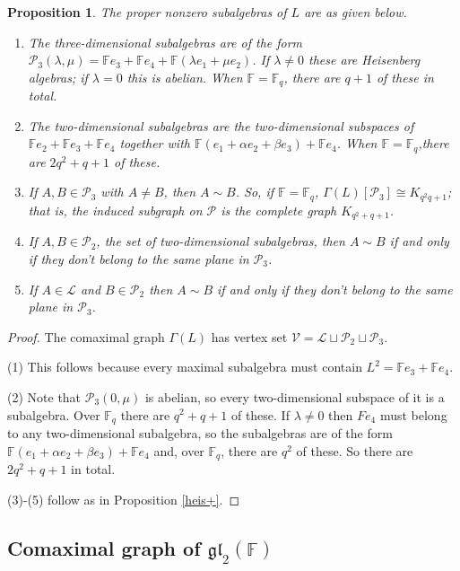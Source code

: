\documentclass[11pt]{amsart}
\theoremstyle{plain}
\newtheorem{proposition}[theorem]{Proposition}
\def\F{\mathbb{F}}
\begin{document}
\begin{proposition}\label{fil} 
The proper nonzero subalgebras of $L$ are as given below.
 \begin{enumerate}
\item The three-dimensional subalgebras are of the form $\mathcal{P}_3(\lambda,\mu)=\F e_3+\F e_4 +\F(\lambda e_1+\mu e_2)$. If $\lambda \neq 0$ these are Heisenberg algebras; if $\lambda = 0$ this is abelian. When $\F=\F_q$, there are $q+1$ of these in total.
\item The two-dimensional subalgebras are the two-dimensional subspaces of $\F e_2+\F e_3+\F e_4$ together with $\F (e_1+\alpha e_2+\beta e_3)+\F e_4$. When $\F=\F_q$,there are $2q^2+q+1$ of these.
\item  If $A, B \in \mathcal{P}_3$ with $A \neq B$, then $A \sim B$. So, if $\F=\F_q$, $\Gamma(L)[\mathcal{P}_3]\cong K_{q^2q+1}$; that is, the induced subgraph on $\mathcal{P}$ is the complete graph $K_{q^2+q+1}$.
 \item If $A,B\in \mathcal{P}_2$, the set of two-dimensional subalgebras, then $A\sim B$ if and only if they don't belong to the same plane in $\mathcal{P}_3$.

\item If $A\in \mathcal{L}$ and $B\in \mathcal{P}_2$ then $A\sim B$ if and only if they don't belong to the same plane in $\mathcal{P}_3$.
 \end{enumerate}   
\end{proposition}
\begin{proof}
The comaximal graph $\Gamma(L)$ has vertex set $\mathcal{V} = \mathcal{L} \sqcup \mathcal{P}_2 \sqcup \mathcal{P}_3$.

\smallskip

\noindent (1) This follows because every maximal subalgebra must contain $L^2=\F e_3+\F e_4$.

\smallskip

\noindent (2) Note that $\mathcal{P}_3(0,\mu)$ is abelian, so every two-dimensional subspace of it is a subalgebra. Over $\F_q$ there are $q^2+q+1$ of these. If $\lambda \neq 0$ then $Fe_4$ must belong to any two-dimensional subalgebra, so the subalgebras are of the form $\F (e_1+\alpha e_2+\beta e_3)+\F e_4$ and, over $\F_q$, there are $q^2$ of these. So there are $2q^2+q+1$ in total.

\smallskip

(3)-(5) follow as in Proposition \ref{heis+}.
\end{proof}

\subsection{Comaximal graph of $\mathfrak{gl}_2(\F)$} 
\end{document}

